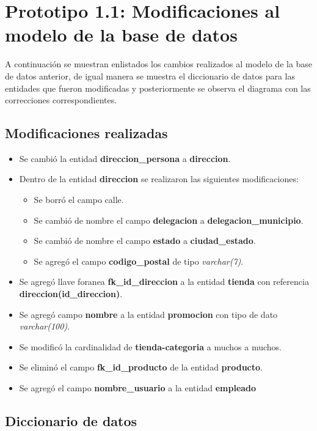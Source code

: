 \section{Prototipo 1.1: Modificaciones al modelo de la base de datos}

A continuación se muestran enlistados los cambios realizados al modelo de la base de datos anterior, de igual manera se muestra el diccionario de datos para las entidades que fueron modificadas y posteriormente se observa el diagrama con las correcciones correspondientes. 
\\ \par
\subsection{Modificaciones realizadas}
\begin{itemize}
\item Se cambió la entidad \textbf{direccion\_persona} a \textbf{direccion}.
\item Dentro de la entidad \textbf{direccion} se realizaron las siguientes modificaciones:
\begin{itemize}
\item Se borró el campo calle.
\item Se cambió de nombre el campo \textbf{delegacion} a \textbf{delegacion\_municipio}.
\item Se cambió de nombre el campo \textbf{estado} a \textbf{ciudad\_estado}.
\item Se agregó el campo \textbf{codigo\_postal} de tipo \textit{varchar(7)}.
\end{itemize}
\item Se agregó llave foranea \textbf{fk\_id\_direccion} a la entidad \textbf{tienda} con referencia  \textbf{direccion(id\_direccion)}.
\item Se agregó campo \textbf{nombre} a la entidad \textbf{promocion} con tipo de dato \textit{varchar(100)}.
\item Se modificó la cardinalidad de \textbf{tienda-categoria} a muchos a muchos.
\item Se eliminó el campo \textbf{fk\_id\_producto} de la entidad \textbf{producto}.
\item Se agregó el campo \textbf{nombre\_usuario} a la entidad \textbf{empleado}

\end{itemize}

\subsection{Diccionario de datos}

